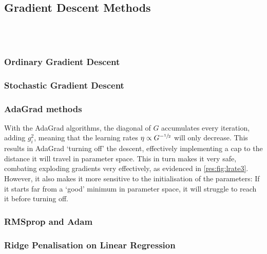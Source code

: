 \\

\subsection{Gradient Descent Methods}
    \\
    \\

    \subsubsection{Ordinary Gradient Descent}

    \subsubsection{Stochastic Gradient Descent}

    \subsubsection{AdaGrad methods}
        With the AdaGrad algorithms, the diagonal of $G$ accumulates every iteration, adding $g_i^2$, meaning that the learning rates $\eta \propto G^{-\sfrac{1}{2}}$ will only decrease. This results in AdaGrad `turning off' the descent, effectively implementing a cap to the distance it will travel in parameter space. This in turn makes it very safe, combating exploding gradients very effectively, as evidenced in \cref{res:fig:lrate3}. However, it also makes it more sensitive to the initialisation of the parameters: If it starts far from a `good' minimum in parameter space, it will struggle to reach it before turning off.

    \subsubsection{RMSprop and Adam}

    \subsubsection{Ridge Penalisation on Linear Regression}
